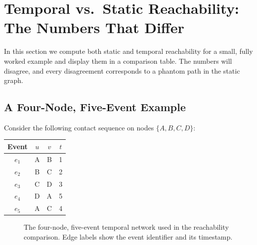 \section{Temporal vs.\ Static Reachability: The Numbers That Differ}
\label{sec:reachability_comparison}

In this section we compute both static and temporal reachability for a small, fully worked
example and display them in a comparison table. The numbers will disagree, and every
disagreement corresponds to a phantom path in the static graph.

\subsection{A Four-Node, Five-Event Example}

Consider the following contact sequence on nodes $\{A, B, C, D\}$:

\begin{center}
\begin{tabular}{cccc}
\toprule
\textbf{Event} & \textbf{$u$} & \textbf{$v$} & \textbf{$t$} \\
\midrule
$e_1$ & A & B & 1 \\
$e_2$ & B & C & 2 \\
$e_3$ & C & D & 3 \\
$e_4$ & D & A & 5 \\
$e_5$ & A & C & 4 \\
\bottomrule
\end{tabular}
\end{center}

\begin{figure}[H]
\centering
{}
\caption{The four-node, five-event temporal network used in the reachability comparison.
Edge labels show the event identifier and its timestamp.}
\label{fig:reachability_example}
\end{figure}

